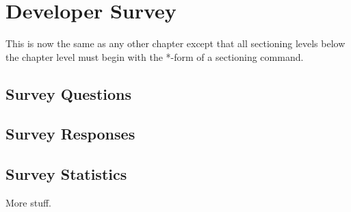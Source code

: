 \chapter{Developer Survey}

This is now the same as any other chapter except that
all sectioning levels below the chapter level must begin
with the *-form of a sectioning command.

\section*{Survey Questions}

\section*{Survey Responses}

\section*{Survey Statistics}

More stuff.
